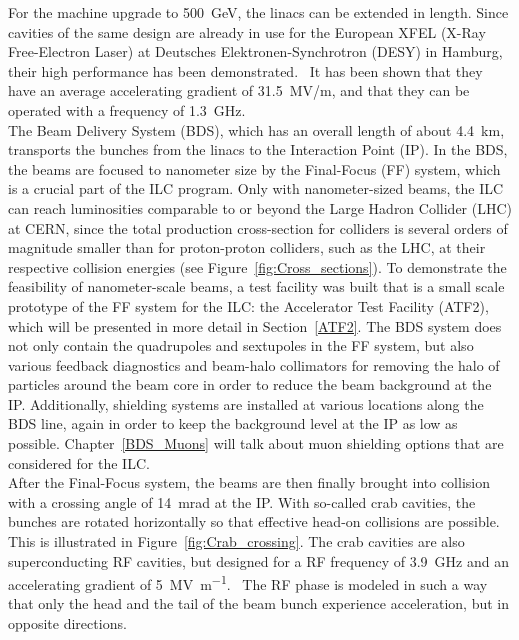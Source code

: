 For the machine upgrade to \SI{500}{\GeV}, the linacs can be extended in length.
Since cavities of the same design are already in use for the European XFEL (X-Ray Free-Electron Laser) at Deutsches Elektronen-Synchrotron (DESY) in Hamburg, their high performance has been demonstrated.~\cite{XFEL}
It has been shown that they have an average accelerating gradient of \SI{31.5}{MV/m}, and that they can be operated with a frequency of \SI{1.3}{\giga\hertz}.~\cite{Walker}\\
The Beam Delivery System (BDS), which has an overall length of about \SI{4.4}{\kilo\meter}, transports the bunches from the linacs to the Interaction Point (IP).
In the BDS, the beams are focused to nanometer size by the Final-Focus (FF) system, which is a crucial part of the ILC program.
Only with nanometer-sized beams, the ILC can reach luminosities comparable to or beyond the Large Hadron Collider (LHC) at CERN, since the total production cross-section for \positron \electron colliders is several orders of magnitude smaller than for proton-proton colliders, such as the LHC, at their respective collision energies (see Figure~\ref{fig:Cross_sections}).
To demonstrate the feasibility of nanometer-scale beams, a test facility was built that is a small scale prototype of the FF system for the ILC: the Accelerator Test Facility (ATF2), which will be presented in more detail in Section~\ref{ATF2}.
The BDS system does not only contain the quadrupoles and sextupoles in the FF system, but also various feedback diagnostics and beam-halo collimators for removing the halo of particles around the beam core in order to reduce the beam background at the IP. 
Additionally, shielding systems are installed at various locations along the BDS line, again in order to keep the background level at the IP as low as possible.
Chapter~\ref{BDS_Muons} will talk about muon shielding options that are considered for the ILC.
\\After the Final-Focus system, the beams are then finally brought into collision with a crossing angle of \SI{14}{\milli\radian} at the IP.\cite[p. 9-10]{TDR1}
With so-called crab cavities, the bunches are rotated horizontally so that effective head-on collisions are possible.
This is illustrated in Figure~\ref{fig:Crab_crossing}.
The crab cavities are also superconducting RF cavities, but designed for a RF frequency of \SI{3.9}{\giga\hertz} and an accelerating gradient of \SI{5}{\mega\volt\per\meter}.~\cite[p. 154]{TDR32}
The RF phase is modeled in such a way that only the head and the tail of the beam bunch experience acceleration, but in opposite directions.
